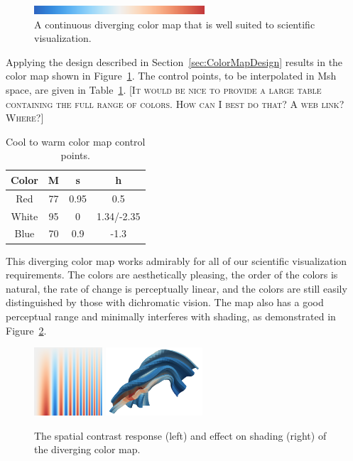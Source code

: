 \documentclass[twocolumn]{article}
\newcommand{\sticky}[1]{\textsc{[#1]}}
\newcommand{\Msh}{Msh\xspace}
\begin{document}
\begin{figure}
  \centering
  \includegraphics[width=2.5in]{images/Cool2WarmBar}
  \caption{A continuous diverging color map that is well suited to scientific
    visualization.}
  \label{fig:Cool2WarmBar}
\end{figure}

Applying the design described in Section~\ref{sec:ColorMapDesign} results
in the color map shown in Figure~\ref{fig:Cool2WarmBar}.  The control
points, to be interpolated in \Msh space, are given in
Table~\ref{table:Cool2Warm}.  \sticky{It would be nice to provide a large
  table containing the full range of colors.  How can I best do that?  A
  web link?  Where?}

\begin{table}
  \centering
  \caption{Cool to warm color map control points.}
  \begin{tabular}{c@{\qquad}ccc}
    Color & M & s & h \\
    \hline
    Red & 77 & 0.95 & 0.5 \\
    White & 95 & 0 & 1.34/-2.35 \\
    Blue & 70 & 0.9 & -1.3
  \end{tabular}
  \label{table:Cool2Warm}
\end{table}

This diverging color map works admirably for all of our scientific
visualization requirements.  The colors are aesthetically pleasing, the
order of the colors is natural, the rate of change is perceptually linear,
and the colors are still easily distinguished by those with dichromatic
vision.  The map also has a good perceptual range and minimally interferes
with shading, as demonstrated in Figure~\ref{fig:Cool2WarmResponse}.

\begin{figure}
  \centering
  \includegraphics[height=1in]{images/Cool2WarmSpatialContrast}
  \quad
  \includegraphics[height=1in]{images/Cool2WarmShading}
  \caption{The spatial contrast response (left) and effect on shading
    (right) of the diverging color map.}
  \label{fig:Cool2WarmResponse}
\end{figure}
\end{document}
